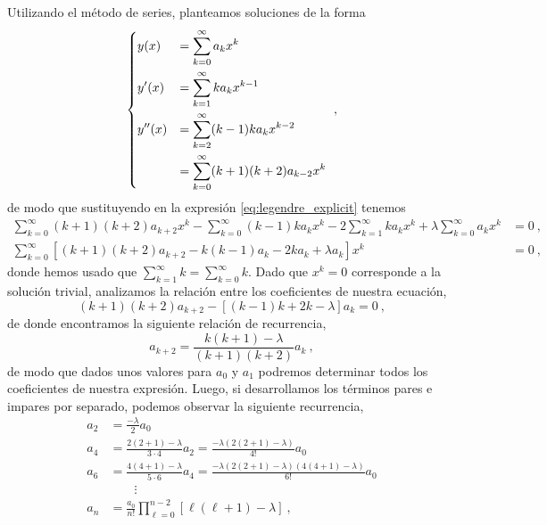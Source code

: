 Utilizando el método de series, planteamos soluciones de la forma
\begin{equation}
    \begin{dcases}
        y(x) & = \sum_{k=0}^{\infty} a_k x^k \\
        y'(x) & = \sum_{k=1}^{\infty} k a_k x^{k-1} \\
        y''(x) & = \sum_{k=2}^{\infty} (k-1)k a_k x^{k-2} \\
        & = \sum_{k=0}^{\infty} (k+1) (k+2) a_{k-2} x^k 
    \end{dcases} \ ,
\end{equation}
de modo que sustituyendo en la expresión \eqref{eq:legendre_explicit} tenemos 
\begin{align}
    \sum_{k=0}^{\infty} (k+1)(k+2) a_{k+2} x^k - \sum_{k=0}^{\infty} (k-1) k a_k x^k - 2 \sum_{k=1}^{\infty} k a_k x^k + \lambda \sum_{k=0}^{\infty} a_k x^k & = 0 \ , \\
    \sum_{k=0}^{\infty} \left[ (k+1)(k+2) a_{k+2} - k(k-1)a_k  - 2k a_k + \lambda a_k \right]x^k & = 0 \ ,
\end{align}
donde hemos usado que $\sum_{k=1}^{\infty} k = \sum_{k=0}^{\infty} k$. Dado que $x^k = 0$ corresponde a la solución trivial, analizamos la relación entre los coeficientes de nuestra ecuación,
\begin{equation}
    (k+1)(k+2) a_{k+2} - [(k-1) k + 2k - \lambda]a_k = 0 \ ,
\end{equation}
de donde encontramos la siguiente relación de recurrencia,
\begin{equation}\label{eq:recurrencia_legendre}
    a_{k+2} = \frac{k(k+1) - \lambda}{(k+1)(k+2)}a_k \ ,
\end{equation}
de modo que dados unos valores para $a_0$ y $a_1$ podremos determinar todos los coeficientes de nuestra expresión. Luego, si desarrollamos los términos pares e impares por separado, podemos observar la siguiente recurrencia,
\begin{align*}
    a_2 & = \frac{-\lambda}{2} a_0 \\
    a_4 & = \frac{2(2+1) - \lambda}{3 \cdot 4} a_2 = \frac{-\lambda(2(2+1)-\lambda)}{4!}a_0 \\
    a_6 & = \frac{4(4+1) - \lambda}{5 \cdot 6} a_4 = \frac{-\lambda (2(2+1)-\lambda)(4(4+1)-\lambda)}{6!} a_0 \\
    & \qquad \vdots \\
    a_n & = \frac{a_0}{n!}\prod_{\ell=0}^{n-2}[\ell (\ell+1) - \lambda] \ ,
\end{align*}
